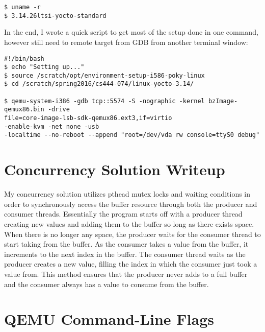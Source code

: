\documentclass[letterpaper,10pt,titlepage]{article}
\begin{document}
\begin{lstlisting}
$ uname -r
$ 3.14.26ltsi-yocto-standard
\end{lstlisting}

In the end, I wrote a quick script to get most of the setup done in one command, however still need to remote target from GDB from another terminal window:

\begin{lstlisting}
#!/bin/bash
$ echo "Setting up..."
$ source /scratch/opt/environment-setup-i586-poky-linux
$ cd /scratch/spring2016/cs444-074/linux-yocto-3.14/

$ qemu-system-i386 -gdb tcp::5574 -S -nographic -kernel bzImage-qemux86.bin -drive
file=core-image-lsb-sdk-qemux86.ext3,if=virtio
-enable-kvm -net none -usb
-localtime --no-reboot --append "root=/dev/vda rw console=ttyS0 debug"
\end{lstlisting}

\section{Concurrency Solution Writeup}

My concurrency solution utilizes pthead mutex locks and waiting conditions in order to synchronously access the buffer resource through both the producer and consumer threads.  Essentially the program starts off with a producer thread creating new values and adding them to the buffer so long as there exists space.  When there is no longer any space, the producer waits for the consumer thread to start taking from the buffer.  As the consumer takes a value from the buffer, it increments to the next index in the buffer.  The consumer thread waits as the producer creates a new value, filling the index in which the consumer just took a value from.  This method ensures that the producer never adds to a full buffer and the consumer always has a value to consume from the buffer.


\section{QEMU Command-Line Flags}
\end{document}
